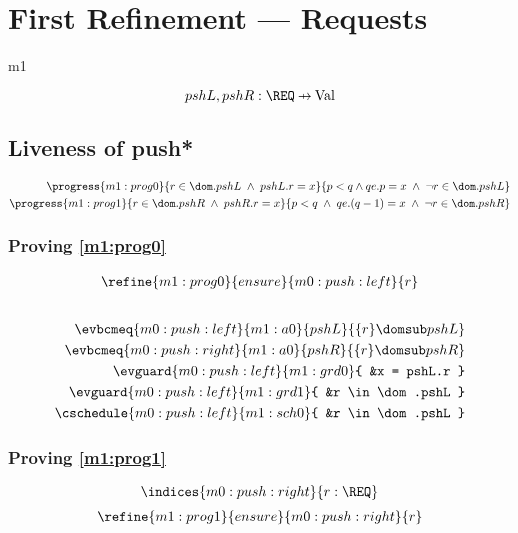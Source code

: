 \documentclass[12pt]{amsart}
\begin{document}
\section{First Refinement --- Requests}
\begin{machine}{m1}
 \\

\[ \variable{pshL,pshR : \REQ \pfun \G} \]

\subsection{Liveness of push*}

\begin{align*}
\progress{m1:prog0}
	{ r \in \dom.pshL \1\land pshL.r = x }
	{ p < q \land qe.p = x \1\land \neg r \in \dom.pshL }
\\ \progress{m1:prog1}
	{ r \in \dom.pshR \1\land pshR.r = x }
	{ p < q \1\land qe.(q-1) = x \1\land \neg r \in \dom.pshR }
\end{align*}

\subsubsection{Proving \ref{m1:prog0}}
\begin{align*}
\refine{m1:prog0}{ensure}{m0:push:left}{ \index{r}{r} }
\end{align*}
\begin{align*}
\\ \evbcmeq{m0:push:left}{m1:a0}{pshL}{ \{ r \} \domsub pshL }
\\ \evbcmeq{m0:push:right}{m1:a0}{pshR}{ \{ r \} \domsub pshR }
\\ \evguard{m0:push:left}{m1:grd0}{ &x = pshL.r }
\\ \evguard{m0:push:left}{m1:grd1}{ &r \in \dom.pshL }
\\ \cschedule{m0:push:left}{m1:sch0}{ &r \in \dom.pshL }
\end{align*}

\subsubsection{Proving \ref{m1:prog1}}
\[ \indices{m0:push:right}{ r : \REQ } \]
\begin{align*}
\refine{m1:prog1}{ensure}{m0:push:right}{ \index{r}{r} }
\end{align*}


\end{machine}
\end{document}

